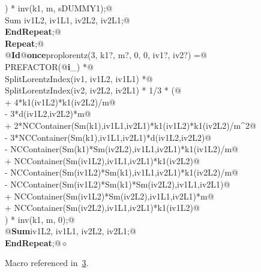\documentclass[a4paper,12pt]{amsart}
\renewcommand{\NWlink}[2]{\hyperlink{#1}{#2}}
\renewcommand{\NWtxtMacroRefIn}{Macro referenced in}
\renewcommand{\NWsep}{${\diamond}$}
\begin{document}
\begin{flushleft}
\begin{minipage}{\linewidth}
\begin{list}{}{}
\mbox{}\verb@      ) * inv(k1, m, sDUMMY1);@\\
\mbox{}\verb@   Sum iv1L2, iv1L1, iv2L2, iv2L1;@\\
\mbox{}\verb@@\hbox{\sffamily\bfseries EndRepeat}\verb@;@\\
\mbox{}\verb@@\hbox{\sffamily\bfseries Repeat}\verb@;@\\
\mbox{}\verb@   @\hbox{\sffamily\bfseries Id}\verb@ @\hbox{\sffamily\bfseries once}\verb@ proplorentz(3, k1?, m?, 0, 0, iv1?, iv2?) =@\\
\mbox{}\verb@      PREFACTOR(@\hbox{\sffamily\bfseries i}\verb@_) *@\\
\mbox{}\verb@      SplitLorentzIndex(iv1, iv1L2, iv1L1) *@\\
\mbox{}\verb@      SplitLorentzIndex(iv2, iv2L2, iv2L1) * 1/3 * (@\\
\mbox{}\verb@         + 4*k1(iv1L2)*k1(iv2L2)/m@\\
\mbox{}\verb@         - 3*d(iv1L2,iv2L2)*m@\\
\mbox{}\verb@         + 2*NCContainer(Sm(k1),iv1L1,iv2L1)*k1(iv1L2)*k1(iv2L2)/m^2@\\
\mbox{}\verb@         - 3*NCContainer(Sm(k1),iv1L1,iv2L1)*d(iv1L2,iv2L2)@\\
\mbox{}\verb@         - NCContainer(Sm(k1)*Sm(iv2L2),iv1L1,iv2L1)*k1(iv1L2)/m@\\
\mbox{}\verb@         + NCContainer(Sm(iv1L2),iv1L1,iv2L1)*k1(iv2L2)@\\
\mbox{}\verb@         - NCContainer(Sm(iv1L2)*Sm(k1),iv1L1,iv2L1)*k1(iv2L2)/m@\\
\mbox{}\verb@         - NCContainer(Sm(iv1L2)*Sm(k1)*Sm(iv2L2),iv1L1,iv2L1)@\\
\mbox{}\verb@         + NCContainer(Sm(iv1L2)*Sm(iv2L2),iv1L1,iv2L1)*m@\\
\mbox{}\verb@         + NCContainer(Sm(iv2L2),iv1L1,iv2L1)*k1(iv1L2)@\\
\mbox{}\verb@      ) * inv(k1, m, 0);@\\
\mbox{}\verb@   @\hbox{\sffamily\bfseries Sum}\verb@ iv1L2, iv1L1, iv2L2, iv2L1;@\\
\mbox{}\verb@@\hbox{\sffamily\bfseries EndRepeat}\verb@;@{\NWsep}
\end{list}
\vspace{-1.5ex}
\footnotesize
\begin{list}{}{\setlength{\itemsep}{-\parsep}\setlength{\itemindent}{-\leftmargin}}
\item \NWtxtMacroRefIn\ \NWlink{nuweb3}{3}.

\item{}
\end{list}
\end{minipage}\vspace{4ex}
\end{flushleft}
\end{document}
